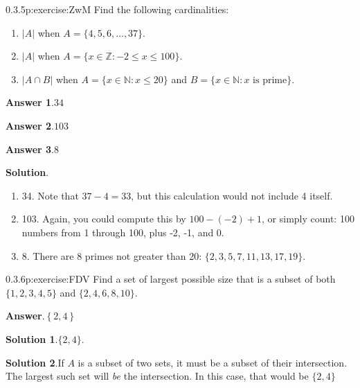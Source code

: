 \documentclass[twoside,11pt,]{book}
\newcommand{\blocktitlefont}{\relax}
\numberwithin{equation}{chapter}
\newcommand{\N}{\mathbb N}
\newcommand{\Z}{\mathbb Z}
\newcommand{\st}{:}
\begin{document}
\begin{divisionsolution}{0.3.5}{}{p:exercise:ZwM}%
Find the following cardinalities:%
\begin{enumerate}[label=(\alph*)]
\item{}\(|A|\) when \(A = \{4,5,6,\ldots,37\}\text{.}\)%
\item{}\(|A|\) when \(A = \{x \in \Z \st -2 \le x \le 100\}\text{.}\)%
\item{}\(|A \cap B|\) when \(A = \{x \in \N \st x \le 20\}\) and \(B = \{x \in \N \st x \mbox{ is prime} \}\text{.}\)%
\end{enumerate}
%
\par\smallskip%
\noindent\textbf{\blocktitlefont Answer 1}.\quad{}\(34\)%
\par\smallskip%
\noindent\textbf{\blocktitlefont Answer 2}.\quad{}\(103\)%
\par\smallskip%
\noindent\textbf{\blocktitlefont Answer 3}.\quad{}\(8\)%
\par\smallskip%
\noindent\textbf{\blocktitlefont Solution}.\quad{}%
\begin{enumerate}[label=(\alph*)]
\item{}34. Note that \(37-4 = 33\text{,}\) but this calculation would not include 4 itself.%
\item{}103. Again, you could compute this by \(100-(-2)+1\text{,}\) or simply count: 100 numbers from 1 through 100, plus -2, -1, and 0.%
\item{}8. There are 8 primes not greater than 20: \(\{2, 3, 5, 7, 11, 13, 17, 19\}\text{.}\)%
\end{enumerate}
%
\end{divisionsolution}%
\begin{divisionsolution}{0.3.6}{}{p:exercise:FDV}%
Find a set of largest possible size that is a subset of both \(\{1, 2, 3, 4, 5\}\) and \(\{2, 4, 6, 8,10\}\text{.}\)%
\par\smallskip%
\noindent\textbf{\blocktitlefont Answer}.\quad{}\(\left\{2,4\right\}\)%
\par\smallskip%
\noindent\textbf{\blocktitlefont Solution 1}.\quad{}\(\{2,4\}\text{.}\)%
\par\smallskip%
\noindent\textbf{\blocktitlefont Solution 2}.\quad{}If \(A\) is a subset of two sets, it must be a subset of their intersection. The largest such set will \emph{be} the intersection. In this case, that would be \(\{2,4\}\)%
\end{divisionsolution}%
\end{document}
